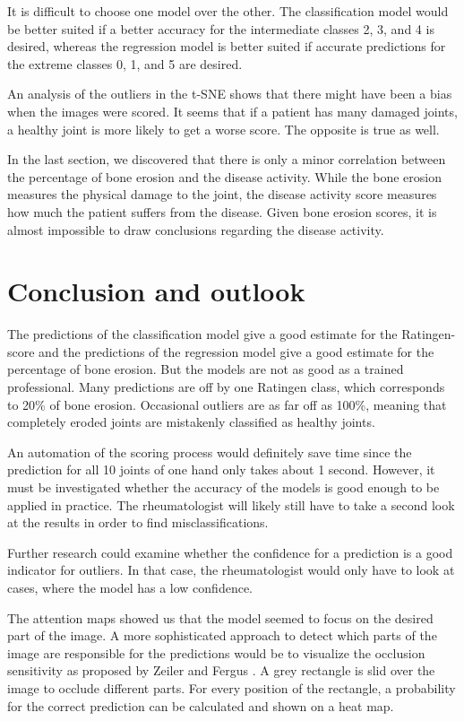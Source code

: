 \documentclass[12pt]{article}
\begin{document}
It is difficult to choose one model over the other. The classification model would be better suited if a better accuracy for the intermediate classes 2, 3, and 4 is desired, whereas the regression model is better suited if accurate predictions for the extreme classes 0, 1, and 5 are desired.

An analysis of the outliers in the t-SNE shows that there might have been a bias when the images were scored. It seems that if a patient has many damaged joints, a healthy joint is more likely to get a worse score. The opposite is true as well.

In the last section, we discovered that there is only a minor correlation between the percentage of bone erosion and the disease activity. While the bone erosion measures the physical damage to the joint, the disease activity score measures how much the patient suffers from the disease. Given bone erosion scores, it is almost impossible to draw conclusions regarding the disease activity.



\newpage
\section{Conclusion and outlook}
\label{sec:conclusion}

The predictions of the classification model give a good estimate for the Ratingen-score and the predictions of the regression model give a good estimate for the percentage of bone erosion. But the models are not as good as a trained professional. Many predictions are off by one Ratingen class, which corresponds to 20\% of bone erosion. Occasional outliers are as far off as 100\%, meaning that completely eroded joints are mistakenly classified as healthy joints. 

An automation of the scoring process would definitely save time since the prediction for all 10 joints of one hand only takes about 1 second. However, it must be investigated whether the accuracy of the models is good enough to be applied in practice. The rheumatologist will likely still have to take a second look at the results in order to find misclassifications.

Further research could examine whether the confidence for a prediction is a good indicator for outliers. In that case, the rheumatologist would only have to look at cases, where the model has a low confidence.

The attention maps showed us that the model seemed to focus on the desired part of the image. A more sophisticated approach to detect which parts of the image are responsible for the predictions would be to visualize the occlusion sensitivity as proposed by Zeiler and Fergus \cite{zeiler_2013}. A grey rectangle is slid over the image to occlude different parts. For every position of the rectangle, a probability for the correct prediction can be calculated and shown on a heat map. 
\end{document}
